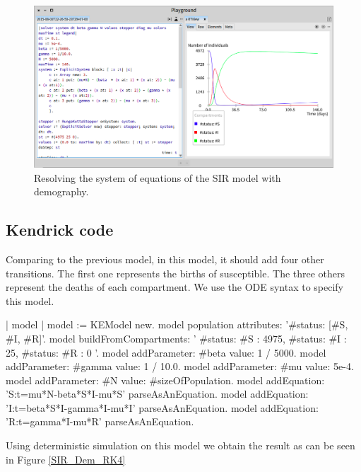 \documentclass[a4paper,10pt,twoside]{book}
\begin{document}
\begin{figure}

\begin{center}
\includegraphics[width=1.0\textwidth]{figures/SIR_Dem_RK4_pharo.png}\caption{Resolving the system of equations of the SIR model with demography.\label{SIR_Dem_RK4_pharo}}\end{center}
\end{figure}

\subsection{Kendrick code}
Comparing to the previous model, in this model, it should add four other transitions. The first one represents the births of susceptible.
The three others represent the deaths of each compartment.
We use the ODE syntax to specify this model.


\begin{code}{}
| model |
	model := KEModel new.
	model population attributes: '{#status: [#S, #I, #R]}'.
  model
		buildFromCompartments:
			'{
		{ #status: #S }: 4975,
		{ #status: #I }: 25,
		{ #status: #R }: 0
	}'.
	model addParameter: #beta value: 1 / 5000.
	model addParameter: #gamma value: 1 / 10.0.
	model addParameter: #mu value: 5e-4.
	model addParameter: #N value: #sizeOfPopulation.
	model addEquation: 'S:t=mu*N-beta*S*I-mu*S' parseAsAnEquation.
	model addEquation: 'I:t=beta*S*I-gamma*I-mu*I' parseAsAnEquation.
	model addEquation: 'R:t=gamma*I-mu*R' parseAsAnEquation.
\end{code}

Using deterministic simulation on this model we obtain the result as can be seen in Figure \ref{SIR_Dem_RK4}
\end{document}
